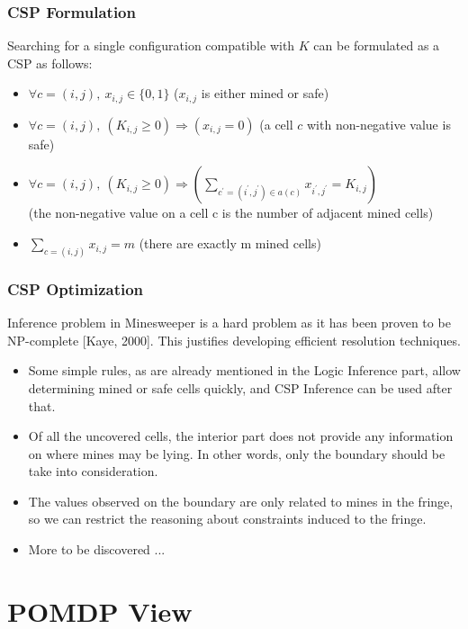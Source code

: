 \documentclass[aspectratio=169]{beamer}
\begin{document}
\begin{frame}
	\frametitle{CSP Formulation}
	Searching for a single configuration compatible with $K$ can be formulated as a CSP as follows:

	\begin{itemize}
		\item ${\forall}c=(i,j),\ x_{i,j} \in \{0,1\}$ \hfill ($x_{i,j}$ is either mined or safe)
		\item ${\forall}c=(i,j),\ (K_{i,j} \geq 0) \Rightarrow (x_{i,j}=0)$ \hfill (a cell $c$ with non-negative value is safe)
		\item ${\forall}c=(i,j),\ (K_{i,j} \geq 0) \Rightarrow (\sum_{c^{\prime}=(i^{\prime},j^{\prime}) \in a(c)} x_{i^{\prime},j^{\prime}} = K_{i,j})$ \\ \hfill (the non-negative value on a cell c is the number of adjacent mined cells)
		\item $\sum_{c=(i,j)} x_{i,j} = m$ \hfill (there are exactly m mined cells)
	\end{itemize}
\end{frame}

\begin{frame}
	\frametitle{CSP Optimization}
	Inference problem in Minesweeper is a hard problem as it has been proven to be NP-complete [Kaye, 2000]. This justifies developing efficient resolution techniques.

	\begin{itemize}
		\item Some simple rules, as are already mentioned in the Logic Inference part, allow determining mined or safe cells quickly, and CSP Inference can be used after that.
		\item Of all the uncovered cells, the interior part does not provide any information on where mines may be lying. In other words, only the boundary should be take into consideration.
		\item The values observed on the boundary are only related to mines in the fringe, so we can restrict the reasoning about constraints induced to the fringe.
		\item More to be discovered ...
	\end{itemize}
\end{frame}


\section{POMDP View}
\end{document}
